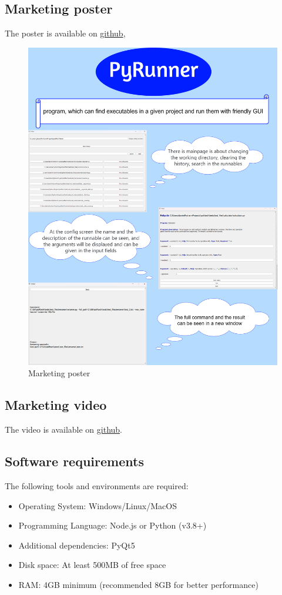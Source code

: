 \documentclass{article}
\begin{document}
\subsection{Marketing poster}
The poster is available on \href{https://github.com/CsullogBeni/szofttech/blob/main/documentation/img/poster.png}{github},
\begin{figure}[h!]
    \centering
    \includegraphics[width=0.8\linewidth]{img/poster.png}
    \caption{Marketing poster}
    \label{fig:enter-label}
\end{figure}

\subsection{Marketing video}

The video is available on \href{https://github.com/CsullogBeni/szofttech/tree/main/documentation/video}{github}.

\subsection{Software requirements}

The following tools and environments are required:

\begin{itemize}
    \item Operating System\@: Windows/Linux/MacOS
    \item Programming Language\@: Node.js or Python (v3.8+)
    \item Additional dependencies\@: PyQt5
    \item Disk space\@: At least 500MB of free space
    \item RAM\@: 4GB minimum (recommended 8GB for better performance)
\end{itemize}
\end{document}
